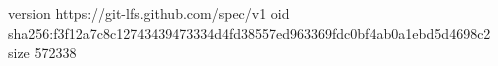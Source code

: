 version https://git-lfs.github.com/spec/v1
oid sha256:f3f12a7c8c12743439473334d4fd38557ed963369fdc0bf4ab0a1ebd5d4698c2
size 572338
